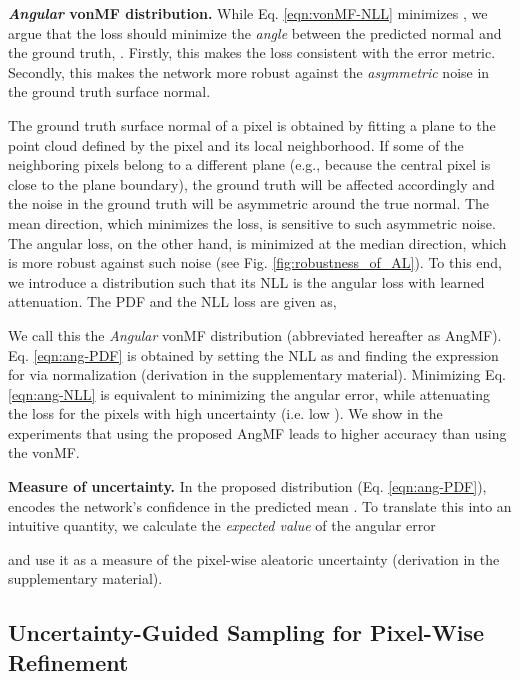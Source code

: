\documentclass[10pt,twocolumn,letterpaper]{article}
\begin{document}
\noindent
\textbf{\textit{Angular} vonMF distribution.} While Eq. \ref{eqn:vonMF-NLL} minimizes , we argue that the loss should minimize the \textit{angle} between the predicted normal and the ground truth, . Firstly, this makes the loss consistent with the error metric. Secondly, this makes the network more robust against the \textit{asymmetric} noise in the ground truth surface normal. 

The ground truth surface normal of a pixel is obtained by fitting a plane to the point cloud defined by the pixel and its local neighborhood. If some of the neighboring pixels belong to a different plane (e.g., because the central pixel is close to the plane boundary), the ground truth will be affected accordingly and the noise in the ground truth will be asymmetric around the true normal. The mean direction, which minimizes the  loss, is sensitive to such asymmetric noise. The angular loss, on the other hand, is minimized at the median direction, which is more robust against such noise (see Fig. \ref{fig:robustness_of_AL}). To this end, we introduce a distribution such that its NLL is the angular loss with learned attenuation. The PDF and the NLL loss are given as,




We call this the \textit{Angular} vonMF distribution (abbreviated hereafter as AngMF). Eq. \ref{eqn:ang-PDF} is obtained by setting the NLL as  and finding the expression for  via normalization (derivation in the supplementary material). Minimizing Eq. \ref{eqn:ang-NLL} is equivalent to minimizing the angular error, while attenuating the loss for the pixels with high uncertainty (i.e. low ). We show in the experiments that using the proposed AngMF leads to higher accuracy than using the vonMF.

\noindent
\textbf{Measure of uncertainty.} In the proposed distribution (Eq. \ref{eqn:ang-PDF}),  encodes the network's confidence in the predicted mean . To translate this into an intuitive quantity, we calculate the \textit{expected value} of the angular error



\noindent
and use it as a measure of the pixel-wise aleatoric uncertainty (derivation in the supplementary material).

\subsection{Uncertainty-Guided Sampling for Pixel-Wise Refinement}
\label{sec:method2}
\end{document}

